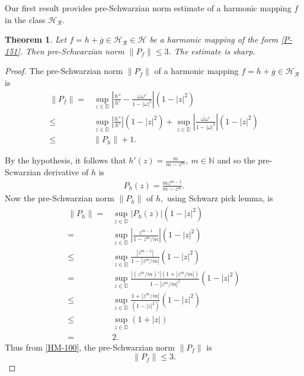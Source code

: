 \documentclass[a4paper,12pt]{amsart}
\newtheorem{thm}{Theorem}[section]
\theoremstyle{definition}
\begin{document}
Our first result provides pre-Schwarzian norm estimate of a harmonic mapping $f$ in the class $\mathcal{H_R}.$
	\begin{thm}
		Let $f=h+\overline{g}\in\mathcal{H_R}\in\mathcal{H}$ be a harmonic mapping of the form \eqref{P-151}. Then pre-Schwarzian norm $\|P_f\|\le 3$. The estimate is sharp. 
	\end{thm}
	\begin{proof}
		The pre-Schwarzian norm $\|P_f\|$ of a harmonic mapping $f=h+\overline{g}\in\mathcal{H_R}$ is 
		\begin{align}\label{HM-100}
			\|P_f\|= & \sup_{z \in \mathbb{D}}\left|\frac{h''}{h'}-\frac{\overline{\omega}\omega'}{1-|\omega|^2}\right|(1-|z|^2)\\\nonumber
			\le & \sup_{z \in \mathbb{D}}\left|\frac{h''}{h'}\right|(1-|z|^2)+\sup_{z \in \mathbb{D}}\left|\frac{\overline{\omega}\omega'}{1-|\omega|^2}\right|(1-|z|^2)\\\nonumber
			\le & 	\|P_h\|+1.
		\end{align}
		
		
		
		
		By the hypothesis, it follows that 
		$h'(z)=\frac{m}{m-z^m},~m\in\mathbb{N}$
		and so the pre-Scwarzian derivative of $h$ is
		\begin{align*}
			P_h(z)=\frac{mz^{m-1}}{m-z^m}. 
		\end{align*}
		Now the pre-Schwarzian norm $\|P_h\|$ of $h,$ using Schwarz pick lemma, is 
		\begin{align*}
			\|P_h\|=&\sup\limits_{z\in\mathbb{D}}|P_h(z)|(1-|z|^2)\\
			=&\sup\limits_{z\in\mathbb{D}}\left|\frac{z^{m-1}}{1-z^m/m}\right|(1-|z|^2)\\
			\le &\sup\limits_{z\in\mathbb{D}}\frac{|z^{m-1}|}{1-\left|z^m/m\right|}(1-|z|^2)\\
			=&\sup\limits_{z\in\mathbb{D}}\frac{|\left(z^m/m\right)'|\left(1+\left|z^m/m\right|\right)}{1-\left|z^m/m\right|^2}(1-|z|^2)\\
			\le&\sup\limits_{z\in\mathbb{D}}\frac{1+\left|z^m/m\right|}{(1-|z|^2)}(1-|z|^2)\\
			\le& \sup\limits_{z\in\mathbb{D}}(1+|z|)\\
			=&2.
		\end{align*}
		Thus from \eqref{HM-100}, the pre-Schwarzian norm $\|P_f\|$ is
		$$\|P_f\|\le 3.$$
		

\end{proof}
\end{document}
